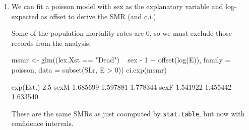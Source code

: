 \begin{enumerate}[resume]

\item We can fit a poisson model with sex as the explanatory variable and
  log-expected as offset to derive the SMR (and c.i.).

  Some of the population mortality rates are 0, so we must exclude
  those records from the analysis.
\begin{Schunk}
\begin{Sinput}
 msmr <- glm((lex.Xst == "Dead") ~ sex - 1 + offset(log(E)),
             family = poisson,
               data = subset(SLr, E > 0))
 ci.exp(msmr)
\end{Sinput}
\begin{Soutput}
     exp(Est.)     2.5%    97.5%
sexM  1.685699 1.597881 1.778344
sexF  1.541922 1.455442 1.633540
\end{Soutput}
\end{Schunk}
  These are the same SMRs as just coomputed by \texttt{stat.table},
  but now with confidence intervals.



\end{enumerate}
